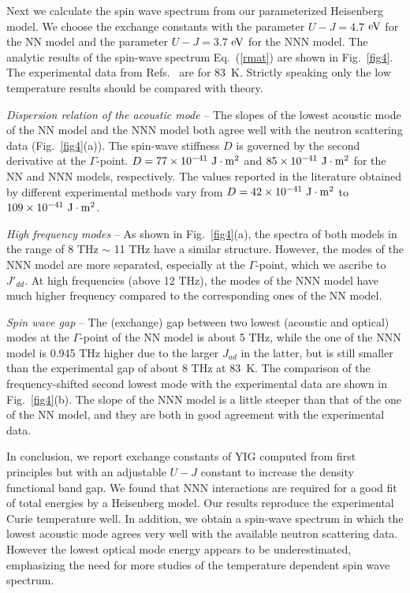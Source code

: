 \documentclass[aps,pre,reprint,superscriptaddress,longbibliography]{revtex4-1}
\begin{document}
Next we calculate the spin wave spectrum from our parameterized Heisenberg model. We choose the exchange constants with the parameter $U-J=4.7$ ${\rm eV}$ for the NN model and the parameter $U-J=3.7$ ${\rm eV}$ for the NNN model. The analytic results of the spin-wave spectrum Eq.~(\ref{rmat}) are shown in Fig.~\ref{fig4}. The experimental data from Refs.~ are for 83~K. Strictly speaking only the low temperature results should be compared with theory. 

\emph{Dispersion relation of the acoustic mode} -- The slopes of the lowest acoustic mode of the NN model and the NNN model both agree well with the neutron scattering data (Fig.~\ref{fig4}(a)). The spin-wave stiffness $D$ is governed by the second derivative at the $\Gamma$-point. $D=77 \times 10^{-41} ~\rm J \cdot \rm m^2$ and $85 \times 10^{-41}~\rm J \cdot \rm m^2$ for the NN and 
NNN models, respectively. The values reported in the literature obtained by different experimental methods \cite{Anderson1964,Cherepanov1993,Srivastava1987} vary from $D = 42 \times 10^{-41}~\rm J \cdot \rm m^2$ to $109 \times 10^{-41}~\rm J \cdot \rm m^2$.

\emph{High frequency modes} -- As shown in Fig.~\ref{fig4}(a), the spectra of both models in the range of 8 THz $\sim$ 11 THz have a similar structure. However, the modes of the NNN model are more separated, especially at the $\Gamma$-point, which we ascribe to $J'_{dd}$. At high frequencies (above 12 THz), the modes of the NNN model have much higher frequency compared to the corresponding ones of the NN model.

\emph{Spin wave gap} -- The (exchange) gap between two lowest (acoustic and optical) modes at the $\Gamma$-point of the NN model is about 5 THz, while the one of the NNN model is 0.945 THz higher due to the larger $J_{ad}$ in the latter, but is still smaller than the experimental gap of about 8 THz at 83~K. The comparison of the frequency-shifted second lowest mode with the experimental data are shown in Fig.~\ref{fig4}(b). The slope of the NNN model is a little steeper than that of the one of the NN model, and they are both in good agreement with the experimental data. 


In conclusion, we report exchange constants of YIG computed from first principles but with an adjustable $U-J$ constant to increase the density functional  band gap. We found that NNN interactions are required for a good fit of total energies by a Heisenberg model. Our results reproduce the experimental Curie temperature well. In addition, we obtain a spin-wave spectrum in which the lowest acoustic mode agrees very well with the available neutron scattering data. However the lowest optical mode energy appears to be underestimated, emphasizing the need for more studies of the temperature dependent spin wave spectrum.
\end{document}
